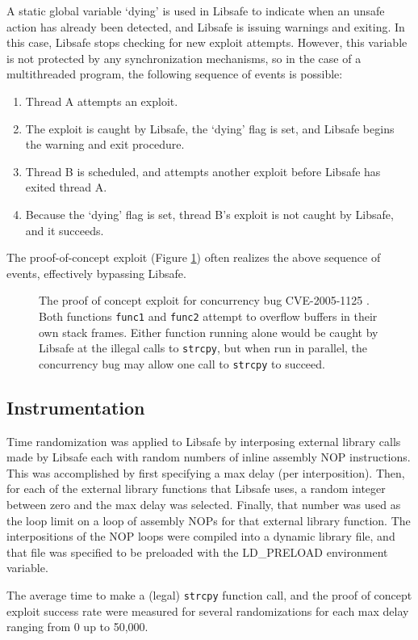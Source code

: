 \documentclass[letterpaper,twocolumn,10pt]{article}
\begin{document}
A static global variable `dying' is used in Libsafe to indicate when an unsafe action has already been detected, and Libsafe is issuing warnings and exiting.  In this case, Libsafe stops checking for new exploit attempts.  However, this variable is not protected by any synchronization mechanisms, so in the case of a multithreaded program, the following sequence of events is possible:
\begin{enumerate}
	\item Thread A attempts an exploit.
	\item The exploit is caught by Libsafe, the `dying' flag is set, and Libsafe begins the warning and exit procedure.
	\item Thread B is scheduled, and attempts another exploit before Libsafe has exited thread A.
	\item Because the `dying' flag is set, thread B's exploit is not caught by Libsafe, and it succeeds.
\end{enumerate}
The proof-of-concept exploit (Figure \ref{fig_poc}) often realizes the above sequence of events, effectively bypassing Libsafe.
\begin{figure}

\caption{The proof of concept exploit for concurrency bug CVE-2005-1125 \cite{CVE2005-1125}.  Both functions \texttt{func1} and \texttt{func2} attempt to overflow buffers in their own stack frames.  Either function running alone would be caught by Libsafe at the illegal calls to \texttt{strcpy}, but when run in parallel, the concurrency bug may allow one call to \texttt{strcpy} to succeed.}
\label{fig_poc}
\end{figure}
\subsection{Instrumentation \cite{Conrad2009}}
Time randomization was applied to Libsafe by interposing external library calls made by Libsafe each with random numbers of inline assembly NOP instructions.  This was accomplished by first specifying a max delay (per interposition).  Then, for each of the external library functions that Libsafe uses, a random integer between zero and the max delay was selected.  Finally, that number was used as the loop limit on a loop of assembly NOPs for that external library function.  The interpositions of the NOP loops were compiled into a dynamic library file, and that file was specified to be preloaded with the LD\_PRELOAD environment variable.

The average time to make a (legal) \texttt{strcpy} function call, and the proof of concept exploit success rate were measured for several randomizations for each max delay ranging from 0 up to 50,000.
\end{document}
